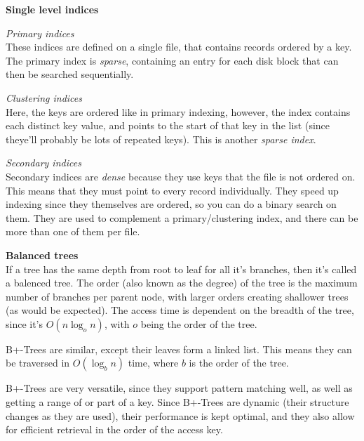 \begin{description}
  \item \textbf{Single level indices}\\
    \begin{description}
      \item \textit{Primary indices}\\
        These indices are defined on a single file, that contains records
        ordered by a key. The primary index is \textit{sparse}, containing an
        entry for each disk block that can then be searched sequentially.
      
      \item \textit{Clustering indices}\\
        Here, the keys are ordered like in primary indexing, however, the index
        contains each distinct key value, and points to the start of that key in
        the list (since theye'll probably be lots of repeated keys). This is
        another \textit{sparse index}.

      \item \textit{Secondary indices}\\
        Secondary indices are \textit{dense} because they use keys that the file
        is not ordered on. This means that they must point to every record
        individually. They speed up indexing since they themselves are ordered,
        so you can do a binary search on them. They are used to complement a
        primary/clustering index, and there can be more than one of them per
        file.
    \end{description}
  \item \textbf{Balanced trees}\\
    If a tree has the same depth from root to leaf for all it's branches, then
    it's called a balenced tree. The order (also known as the degree) of the
    tree is the maximum number of branches per parent node, with larger orders
    creating shallower trees (as would be expected). The access time is
    dependent on the breadth of the tree, since it's $O(n\log_o{n})$, with $o$
    being the order of the tree.

    B+-Trees are similar, except their leaves form a linked list. This means
    they can be traversed in $O(\log_b{n})$ time, where $b$ is the order of the
    tree.

    B+-Trees are very versatile, since they support pattern matching well, as
    well as getting a range of or part of a key. Since B+-Trees are dynamic
    (their structure changes as they are used), their performance is kept
    optimal, and they also allow for efficient retrieval in the order of the
    access key.
\end{description}
